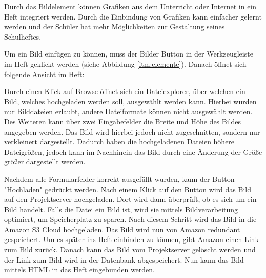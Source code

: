 
Durch das Bildelement können Grafiken aus dem Unterricht oder Internet in ein Heft integriert werden. Durch die Einbindung von Grafiken kann einfacher gelernt werden und der Schüler hat mehr Möglichkeiten zur Gestaltung seines Schulheftes.

Um ein Bild einfügen zu können, muss der Bilder Button in der Werkzeugleiste im Heft geklickt werden (siehe Abbildung \ref{itm:elemente}). Danach öffnet sich folgende Ansicht im Heft:


Durch einen Klick auf Browse öffnet sich ein Dateiexplorer, über welchen ein Bild, welches hochgeladen werden soll, ausgewählt werden kann. Hierbei wurden nur Bilddateien erlaubt, andere Dateiformate können nicht ausgewählt werden. Des Weiteren kann über zwei Eingabefelder die Breite und Höhe des Bildes angegeben werden. Das Bild wird hierbei jedoch nicht zugeschnitten, sondern nur verkleinert dargestellt. Dadurch haben die hochgeladenen Dateien höhere Dateigrößen, jedoch kann im Nachhinein das Bild durch eine Änderung der Größe größer dargestellt werden. 

Nachdem alle Formularfelder korrekt ausgefüllt wurden, kann der Button "Hochladen" gedrückt werden. Nach einem Klick auf den Button wird das Bild auf den Projektserver hochgeladen. Dort wird dann überprüft, ob es sich um ein Bild handelt. Falls die Datei ein Bild ist, wird sie mittels Bildverarbeitung optimiert, um Speicherplatz zu sparen. Nach diesem Schritt wird das Bild in die Amazon S3 Cloud hochgeladen. Das Bild wird nun von Amazon redundant gespeichert. Um es später ins Heft einbinden zu können, gibt Amazon einen Link zum Bild zurück. Danach kann das Bild vom Projektserver gelöscht werden und der Link zum Bild wird in der Datenbank abgespeichert. Nun kann das Bild mittels HTML in das Heft eingebunden werden. 